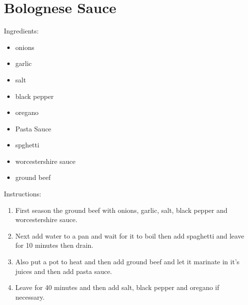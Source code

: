 \documentclass{article}
\begin{document}

\section{Bolognese Sauce}

Ingredients:

\begin{itemize}
    \item onions
    \item garlic
    \item salt
    \item black pepper
    \item oregano
    \item Pasta Sauce
    \item spghetti
    \item worcestershire sauce
    \item ground beef
\end{itemize}

Instructions:
\begin{enumerate}
    \item First season the ground beef with onions, garlic, salt, black pepper and worcestershire sauce.
    \item Next add water to a pan and wait for it to boil then add spaghetti and leave for 10 minutes then drain.
    \item Also put a pot to heat and then add ground beef and let it marinate in it's juices and then add pasta sauce.
    \item Leave for 40 minutes and then add salt, black pepper and oregano if necessary.
\end{enumerate}
\end{document}
